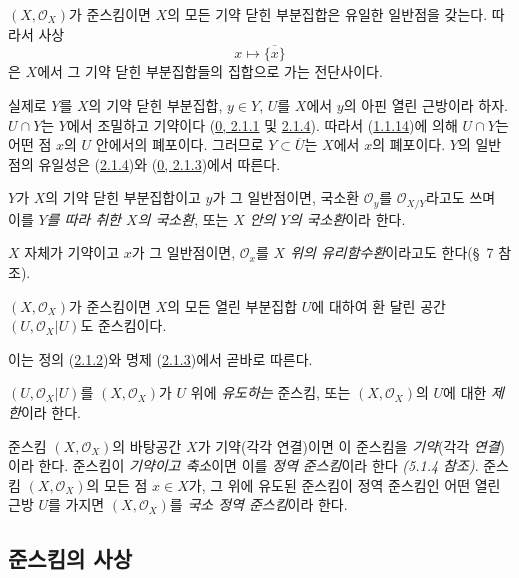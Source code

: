 \begin{proposition}[2.1.5]
\label{I.2.1.5-ko}
$(X,\mathscr{O}_X)$가 준스킴이면 $X$의 모든 기약 닫힌 부분집합은
유일한 일반점을 갖는다. 따라서 사상
\[
  x\longmapsto\overline{\{x\}}
\]
은 $X$에서 그 기약 닫힌 부분집합들의 집합으로 가는 전단사이다.
\end{proposition}

실제로 $Y$를 $X$의 기약 닫힌 부분집합, $y\in Y$, $U$를 $X$에서
$y$의 아핀 열린 근방이라 하자. $U\cap Y$는 $Y$에서 조밀하고
기약이다
(\hyperref[0.2.1.1-ko]{0, 2.1.1} 및
\hyperref[0.2.1.4-ko]{2.1.4}). 따라서
(\hyperref[I.1.1.14-ko]{1.1.14})에 의해 $U\cap Y$는 어떤 점 $x$의
$U$ 안에서의 폐포이다. 그러므로 $Y\subset\overline U$는 $X$에서
$x$의 폐포이다. $Y$의 일반점의 유일성은
(\hyperref[I.2.1.4-ko]{2.1.4})와
(\hyperref[0.2.1.3-ko]{0, 2.1.3})에서 따른다.

\begin{env}[2.1.6]
\label{I.2.1.6-ko}
$Y$가 $X$의 기약 닫힌 부분집합이고 $y$가 그 일반점이면, 국소환
$\mathscr{O}_y$를 $\mathscr{O}_{X/Y}$라고도 쓰며 이를
\emph{$Y$를 따라 취한 $X$의 국소환}, 또는 \emph{$X$ 안의 $Y$의
국소환}이라 한다.

$X$ 자체가 기약이고 $x$가 그 일반점이면, $\mathscr{O}_x$를
\emph{$X$ 위의 유리함수환}이라고도 한다(§~7 참조).
\end{env}

\begin{proposition}[2.1.7]
\label{I.2.1.7-ko}
$(X,\mathscr{O}_X)$가 준스킴이면 $X$의 모든 열린 부분집합 $U$에
대하여 환 달린 공간 $(U,\mathscr{O}_X|U)$도 준스킴이다.
\end{proposition}

이는 정의 (\hyperref[I.2.1.2-ko]{2.1.2})와 명제
(\hyperref[I.2.1.3-ko]{2.1.3})에서 곧바로 따른다.

$(U,\mathscr{O}_X|U)$를 $(X,\mathscr{O}_X)$가 $U$ 위에
\emph{유도하는} 준스킴, 또는 $(X,\mathscr{O}_X)$의 $U$에 대한
\emph{제한}이라 한다.

\begin{env}[2.1.8]
\label{I.2.1.8-ko}
준스킴 $(X,\mathscr{O}_X)$의 바탕공간 $X$가 기약(각각 연결)이면
이 준스킴을 \emph{기약}(각각 \emph{연결})이라 한다. 준스킴이
\emph{기약이고 축소}이면 이를 \emph{정역 준스킴}이라 한다
\emph{(5.1.4 참조)}. 준스킴 $(X,\mathscr{O}_X)$의 모든 점
$x\in X$가, 그 위에 유도된 준스킴이 정역 준스킴인 어떤 열린 근방
$U$를 가지면 $(X,\mathscr{O}_X)$를 \emph{국소 정역 준스킴}이라
한다.
\end{env}

\subsection{준스킴의 사상}
\label{subsection:I.2.2-ko}
\label{I.2.2-ko}

